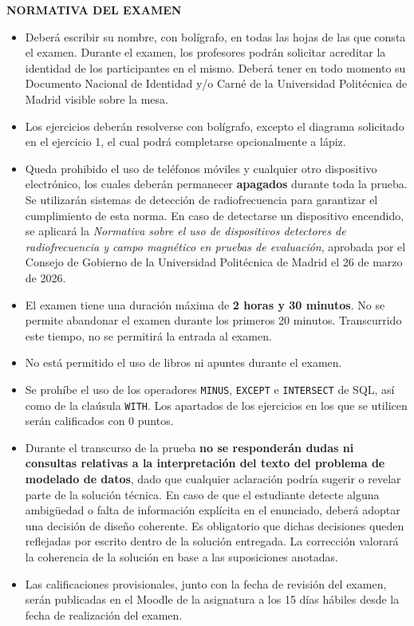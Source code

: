 \documentclass[10pt,a4paper,addpoints,answers]{exam}
\begin{document}
\begin{center}\textbf{NORMATIVA DEL EXAMEN}\end{center}
\begin{itemize}
    \item Deberá escribir su nombre, con bolígrafo, en todas las hojas de las que consta el examen. Durante el examen, los profesores podrán solicitar acreditar la identidad de los participantes en el mismo. Deberá tener en todo momento su Documento Nacional de Identidad y/o Carné de la Universidad Politécnica de Madrid visible sobre la mesa.
    \item Los ejercicios deberán resolverse con bolígrafo, excepto el diagrama solicitado en el ejercicio 1, el cual podrá completarse opcionalmente a lápiz.
    \item Queda prohibido el uso de teléfonos móviles y cualquier otro dispositivo electrónico, los cuales deberán permanecer \textbf{apagados} durante toda la prueba. Se utilizarán sistemas de detección de radiofrecuencia para garantizar el cumplimiento de esta norma. En caso de detectarse un dispositivo encendido, se aplicará la \textit{Normativa sobre el uso de dispositivos detectores de radiofrecuencia y campo magnético en pruebas de evaluación}, aprobada por el Consejo de Gobierno de la Universidad Politécnica de Madrid el 26 de marzo de 2026.
    \item El examen tiene una duración máxima de \textbf{2 horas y 30 minutos}. No se permite abandonar el examen durante los primeros 20 minutos. Transcurrido este tiempo, no se permitirá la entrada al examen. 
    \item No está permitido el uso de libros ni apuntes durante el examen.
    \item Se prohíbe el uso de los operadores \texttt{MINUS}, \texttt{EXCEPT} e \texttt{INTERSECT} de SQL, así como de la claúsula \texttt{WITH}. Los apartados de los ejercicios en los que se utilicen serán calificados con 0 puntos.
    \item Durante el transcurso de la prueba \textbf{no se responderán dudas ni consultas relativas a la interpretación del texto del problema de modelado de datos}, dado que cualquier aclaración podría sugerir o revelar parte de la solución técnica. En caso de que el estudiante detecte alguna ambigüedad o falta de información explícita en el enunciado, deberá adoptar una decisión de diseño coherente. Es obligatorio que dichas decisiones queden reflejadas por escrito dentro de la solución entregada. La corrección valorará la coherencia de la solución en base a las suposiciones anotadas.
    \item Las calificaciones provisionales, junto con la fecha de revisión del examen, serán publicadas en el Moodle de la asignatura a los 15 días hábiles desde la fecha de realización del examen.
\end{itemize}
\end{document}
